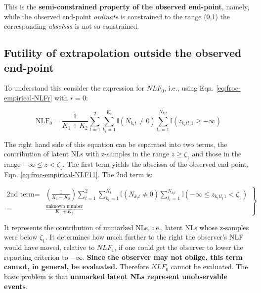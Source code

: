 \documentclass[
]{book}
\begin{document}
This is the \textbf{semi-constrained property of the observed end-point}, namely, while the observed end-point \emph{ordinate} is constrained to the range (0,1) the corresponding \emph{abscissa} is not so constrained.

\hypertarget{froc-empirical-froc-plot-futility-extrapolation}{%
\subsection{Futility of extrapolation outside the observed end-point}\label{froc-empirical-froc-plot-futility-extrapolation}}

To understand this consider the expression for \(NLF_0\), i.e., using Eqn. \eqref{eq:froc-empirical-NLFr} with \(r = 0\):

\begin{equation}
\text{NLF}_0 = \frac{1}{K_1+K_2} \sum_{t=1}^{2} \sum_{k_t=1}^{K_t} \mathbb{I} \left ( N_{k_t t} \neq 0 \right ) \sum_{l_1=1}^{N_{k_t t}} \mathbb{I} \left ( z_{k_t t l_1 1} \geq -\infty \right ) 
\end{equation}

The right hand side of this equation can be separated into two terms, the contribution of latent NLs with z-samples in the range \(z \geq \zeta_1\) and those in the range \(-\infty \leq z < \zeta_1\). The first term yields the abscissa of the observed end-point, Eqn. \eqref{eq:froc-empirical-NLF11}. The 2nd term is:

\begin{equation}
\left. 
\begin{aligned} 
\text{2nd term}=&\left (\frac{1}{K_1+K_2} \right )\sum_{t=1}^{2} \sum_{k_t=1}^{K_t} \mathbb{I} \left ( N_{k_t t} \neq 0 \right ) \sum_{l_1=1}^{N_{k_t t}} \mathbb{I} \left ( -\infty \leq z_{k_t t l_1 1} < \zeta_1 \right )\\
=&\frac{\text{unknown number}}{K_1+K_2}
\end{aligned}
\right \} 
\label{eq:froc-empirical-NLF0a}
\end{equation}

It represents the contribution of unmarked NLs, i.e., latent NLs whose z-samples were below \(\zeta_1\). It determines how much further to the right the observer's NLF would have moved, relative to \(NLF_1\), if one could get the observer to lower the reporting criterion to \(-\infty\). \textbf{Since the observer may not oblige, this term cannot, in general, be evaluated.} Therefore \(NLF_0\) cannot be evaluated. The basic problem is that \textbf{unmarked latent NLs represent unobservable events}.
\end{document}
